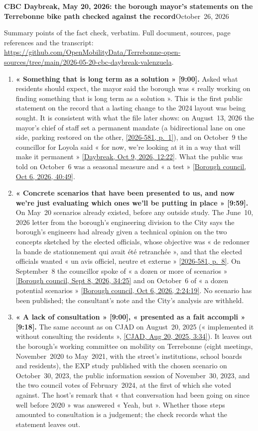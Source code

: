 \documentclass[10pt,letterpaper]{article}
\newcommand{\repourl}{https://github.com/OpenMobilityData/Terrebonne-open-sources}
\newcommand{\pagesurl}{https://openmobilitydata.github.io/Terrebonne-access-requests}
\newcommand{\cliptime}[1]{\textsf{\small[#1]}}
\newcommand{\octsix}[2]{\href{\repourl/blob/main/2026-10-06-borough-council/derived/#1}{\textsf{\small[Borough council, Oct 6, 2026, #2]}}}
\newcommand{\septeight}[1]{\href{\repourl/blob/main/2026-09-08-borough-council/}{\textsf{\small[Borough council, Sept 8, 2026, #1]}}}
\newcommand{\dbocttime}[1]{\href{\repourl/blob/main/2026-cbc-daybreak-interview/}{\textsf{\small[Daybreak, Oct 9, 2026, #1]}}}
\newcommand{\cjad}[1]{\href{\repourl/blob/main/2025-08-20-cjad-valenzuela/derived/2025-08-20_CJAD_Valenzuela_transcript_en.md}{\textsf{\small[CJAD, Aug 20, 2025, #1]}}}
\newcommand{\pgl}[2]{\href{\pagesurl/2026-581/raw/01_emails_mandate_counts.pdf\#page=#1}{\textsf{\small[2026-581, p.~#2]}}}
\newcommand{\pg}[1]{\pgl{#1}{#1}}
\begin{document}
{\large\bfseries CBC Daybreak, May 20, 2026: the borough mayor's statements on the Terrebonne bike path checked against the record}\hfill{\small October~26, 2026}

\vspace{-0.2em}
{\small Summary points of the fact check, verbatim. Full document, sources, page references and the transcript:\\ \href{\repourl/tree/main/2026-05-20-cbc-daybreak-valenzuela}{\repourl/tree/main/2026-05-20-cbc-daybreak-valenzuela}.}
\vspace{0.4em}

\begin{enumerate}[nosep,itemsep=0.3em,leftmargin=1.4em]
\item \textbf{« Something that is long term as a solution » \cliptime{9:00}.} Asked what residents should expect, the mayor said the borough was « really working on finding something that is long term as a solution ». This is the first public statement on the record that a lasting change to the 2024 layout was being sought. It is consistent with what the file later shows: on August~13, 2026 the mayor's chief of staff set a permanent mandate (a bidirectional lane on one side, parking restored on the other, \pg{1}), and on October~9 the councillor for Loyola said « for now, we're looking at it in a way that will make it permanent » \dbocttime{12:22}. What the public was told on October~6 was a seasonal measure and « a test » \octsix{2026-10-06_01.md}{40:49}.
\item \textbf{« Concrete scenarios that have been presented to us, and now we're just evaluating which ones we'll be putting in place » \cliptime{9:59}.} On May~20 scenarios already existed, before any outside study. The June~10, 2026 letter from the borough's engineering division to the City says the borough's engineers had already given a technical opinion on the two concepts sketched by the elected officials, whose objective was « de redonner la bande de stationnement qui avait été retranchée », and that the elected officials wanted « un avis officiel, neutre et externe » \pg{8}. On September~8 the councillor spoke of « a dozen or more of scenarios » \septeight{34:25} and on October~6 of « a dozen potential scenarios » \octsix{2026-10-06_05.md}{2:24:19}. No scenario has been published; the consultant's note and the City's analysis are withheld.
\item \textbf{« A lack of consultation » \cliptime{9:00}, « presented as a fait accompli » \cliptime{9:18}.} The same account as on CJAD on August~20, 2025 (« implemented it without consulting the residents », \cjad{3:34}). It leaves out the borough's working committee on mobility on Terrebonne (eight meetings, November~2020 to May~2021, with the street's institutions, school boards and residents), the EXP study published with the chosen scenario on October~30, 2023, the public information session of November~30, 2023, and the two council votes of February~2024, at the first of which she voted against. The host's remark that « that conversation had been going on since well before 2020 » was answered « Yeah, but ». Whether those steps amounted to consultation is a judgement; the check records what the statement leaves out.

\end{enumerate}
\end{document}
